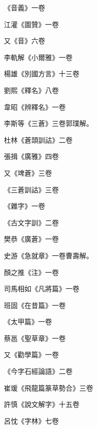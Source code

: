 \begin{pinyinscope}
 《音義》一卷



 江灌《圖贊》一卷



 又《音》六卷



 李軌解《小爾雅》一卷



 楊雄《別國方言》十三卷



 劉熙《釋名》八卷



 韋昭《辨釋名》一卷



 李斯等《三蒼》三卷郭璞解。



 杜林《蒼頡訓詁》二卷



 張揖《廣雅》四卷



 又《埤蒼》三卷



 《三蒼訓詁》三卷



 《雜字》一卷



 《古文字訓》二卷



 樊恭《廣蒼》一卷



 史游《急就章》一卷曹壽解。



 顏之推《注》一卷



 司馬相如《凡將篇》一卷



 班固《在昔篇》一卷



 《太甲篇》一卷



 蔡邕《聖草章》一卷



 又《勸學篇》一卷



 《今字石經論語》二卷



 崔瑗《飛龍篇篆草勢合》三卷



 許慎《說文解字》十五卷



 呂忱《字林》七卷




\end{pinyinscope}
